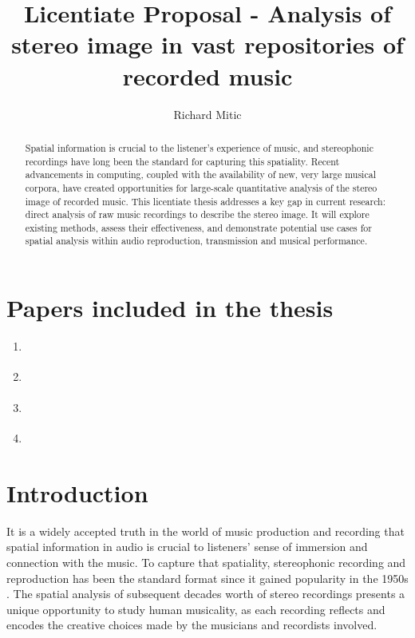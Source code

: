 \documentclass[a4paper]{article}
\title{Licentiate Proposal - Analysis of stereo image in vast repositories of recorded music}
\author{Richard Mitic}
\begin{document}
\maketitle


\begin{abstract}
Spatial information is crucial to the listener's experience of music, and stereophonic recordings have long been the standard for capturing this spatiality. Recent advancements in computing, coupled with the availability of new, very large musical corpora, have created opportunities for large-scale quantitative analysis of the stereo image of recorded music. This licentiate thesis addresses a key gap in current research: direct analysis of raw music recordings to describe the stereo image. It will explore existing methods, assess their effectiveness, and demonstrate potential use cases for spatial analysis within audio reproduction, transmission and musical performance.
\end{abstract}


\section*{Papers included in the thesis}
\label{sec:papers_basic}

\begin{refsection}
\begin{enumerate}[label=\textbf{\Alph*}]
    \item {} \label{paper:auxtrument}
    \item {}\label{paper:dafx}
    \item {}\label{paper:bth}
    \item {}\label{paper:slr}
\end{enumerate}
\end{refsection}

\pagebreak

\section{Introduction}

It is a widely accepted truth in the world of music production and recording that spatial information in audio is crucial to  listeners' sense of immersion and connection with the music. To capture that spatiality, stereophonic recording and reproduction has been the standard format since it gained popularity in the 1950s \cite{lanierHIFITWOCHANNELCOMMOTION1957}. The spatial analysis of subsequent decades worth of stereo recordings presents a unique opportunity to study human musicality, as each recording reflects and encodes the creative choices made by the musicians and recordists involved.
\end{document}
